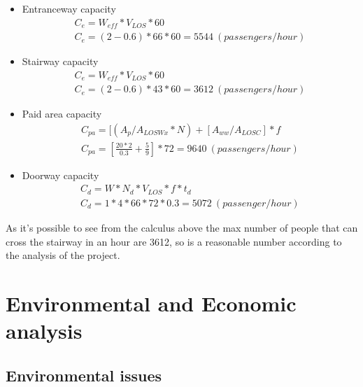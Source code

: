 \documentclass{article}
\begin{document}
\begin{itemize}
\item Entranceway capacity
\begin{equation}
\begin{gathered}
C_{e}=W_{eff}*V_{LOS}*60 
\\
C_{e}=(2-0.6)*66*60=5544 \:(passengers/hour) 
\end{gathered}
\end{equation}
\item Stairway capacity
\begin{equation}
\begin{gathered}
C_{e}=W_{eff}*V_{LOS}*60 
\\
C_{e}=(2-0.6)*43*60=3612 \:(passengers/hour) 
\end{gathered}
\end{equation}
\item Paid area capacity
\begin{equation}
\begin{gathered}
C_{pa}=[(A_p/A_{LOSWx}*N)+[A_{ww}/A_{LOSC}]*f
\\
C_{pa}=\left[\frac{20*2}{0.3}+\frac{5}{9}\right]*72=9640 \:(passengers/hour)
\end{gathered}
\end{equation}
\item Doorway capacity
\begin{equation}
\begin{gathered}
C_d= W*N_d*V_{LOS}*f*t_{d}
\\
C_d= 1*4*66*72*0.3=5072 \:(passenger/hour)
\end{gathered}
\end{equation}
\end{itemize}
As it’s possible to see from the calculus above the max number of people that can cross the stairway in an hour are 3612, so is a reasonable number according to the analysis of the project. 

\newpage
\section{Environmental and Economic analysis}%
\subsection{Environmental issues}
\end{document}
